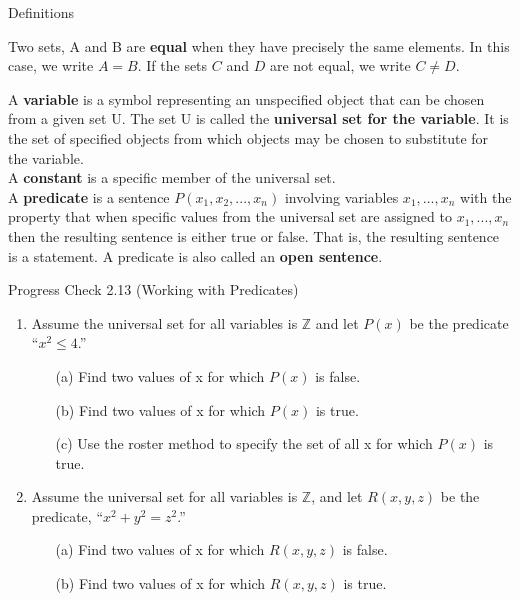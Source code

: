 \documentclass{beamer}
\begin{document}
\begin{frame}{Definitions}
	\begin{definition}
		Two sets, A and B are \textbf{equal} when they have precisely the same elements.  In this case, we write $A = B$.  If the sets $C$ and $D$ are not equal, we write $C \neq D$.
	\end{definition}

	\vspace{.2 in}
	\pause
	
	\begin{definition}
		A \textbf{variable} is a symbol representing an unspecified object that can
		be chosen from a given set U. The set U is called the \textbf{universal set for the
		variable}. It is the set of specified objects from which objects may be chosen
		to substitute for the variable.\\[.1 in]
		
		A \textbf{constant} is a specific member of the universal set.\\[.1 in]
		
		A \textbf{predicate} is a sentence $P(x_1, x_2, ..., x_n)$ involving variables $x_1, ..., x_n$ with the property that when specific values from the universal set are assigned to $x_1, ..., x_n$ then the resulting sentence is either true or false. That is, the resulting sentence is a statement.  A predicate is also called an \textbf{open sentence}. %
	\end{definition}
\end{frame}

\begin{frame}{Progress Check 2.13 (Working with Predicates)}
	\begin{enumerate}
		\item Assume the universal set for all variables is $\mathbb{Z}$ and let $P(x)$ be the predicate ``$x^2 \leq 4$.'' \pause
		\begin{itemize}
			\item[(a)] Find two values of x for which $P(x)$ is false. \pause
			\item[(b)] Find two values of x for which $P(x)$ is true. \pause
			\item[(c)] Use the roster method to specify the set of all x for which $P(x)$ is true. \pause
		\end{itemize}
		\item Assume the universal set for all variables is $\mathbb{Z}$, and let $R(x,y,z)$ be the predicate, ``$x^2 + y^2 = z^2$.'' \pause
		\begin{itemize}
			\item[(a)] Find two values of x for which $R(x,y,z)$ is false. \pause
			\item[(b)] Find two values of x for which $R(x,y,z)$ is true. 
		\end{itemize}
	\end{enumerate}
\end{frame}
\end{document}
